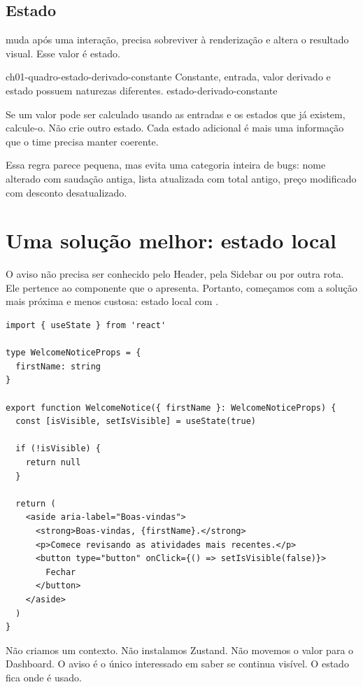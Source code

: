 \subsection{Estado}

 muda após uma interação, precisa sobreviver à
renderização e altera o resultado visual. Esse valor é estado.

\imagemcapitulo
  {ch01-quadro-estado-derivado-constante}
  {Constante, entrada, valor derivado e estado possuem naturezas diferentes.}
  {estado-derivado-constante}

\begin{decisao}
Se um valor pode ser calculado usando as entradas e os estados que já existem,
calcule-o. Não crie outro estado. Cada estado adicional é mais uma informação
que o time precisa manter coerente.
\end{decisao}

Essa regra parece pequena, mas evita uma categoria inteira de bugs: nome alterado
com saudação antiga, lista atualizada com total antigo, preço modificado com
desconto desatualizado.

\section{Uma solução melhor: estado local}

O aviso não precisa ser conhecido pelo Header, pela Sidebar ou por outra rota.
Ele pertence ao componente que o apresenta. Portanto, começamos com a solução
mais próxima e menos custosa: estado local com .

\begin{lstlisting}[caption={O primeiro comportamento do DevPanel.},label={lst:welcome-state}]
import { useState } from 'react'

type WelcomeNoticeProps = {
  firstName: string
}

export function WelcomeNotice({ firstName }: WelcomeNoticeProps) {
  const [isVisible, setIsVisible] = useState(true)

  if (!isVisible) {
    return null
  }

  return (
    <aside aria-label="Boas-vindas">
      <strong>Boas-vindas, {firstName}.</strong>
      <p>Comece revisando as atividades mais recentes.</p>
      <button type="button" onClick={() => setIsVisible(false)}>
        Fechar
      </button>
    </aside>
  )
}
\end{lstlisting}

Não criamos um contexto. Não instalamos Zustand. Não movemos o valor para o
Dashboard. O aviso é o único interessado em saber se continua visível. O estado
fica onde é usado.

